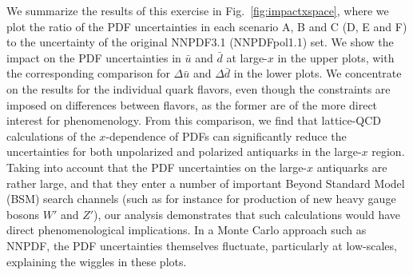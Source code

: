 We summarize the results of this exercise in Fig.~\ref{fig:impactxspace}, 
where we plot the ratio of the PDF uncertainties in each scenario A, B and C 
(D, E and F) to the uncertainty of the original
NNPDF3.1 (NNPDFpol1.1) set.
%
We show the impact on the PDF uncertainties
in $\bar{u}$ and $\bar{d}$ at large-$x$ in the upper
plots, with the corresponding comparison for $\Delta\bar{u}$
and $\Delta\bar{d}$ in the lower plots.
%
We concentrate on the results for the individual quark flavors, even though 
the constraints are imposed on differences between flavors, as the former are 
of the more direct interest for phenomenology. 
%
From this comparison, we find that lattice-QCD calculations of the 
$x$-dependence of PDFs can significantly reduce the uncertainties for both 
unpolarized and polarized antiquarks in the large-$x$ region.
%
Taking into account that the PDF uncertainties on the large-$x$
antiquarks are rather large, and that they
enter a number of important Beyond Standard Model (BSM) search channels
(such as for instance for production of new heavy gauge bosons $W'$ and $Z'$),
our analysis demonstrates that such calculations would have direct
phenomenological implications.
%
In a Monte Carlo approach such as NNPDF, the
PDF uncertainties themselves fluctuate, particularly at low-scales,
explaining the wiggles in these plots.

